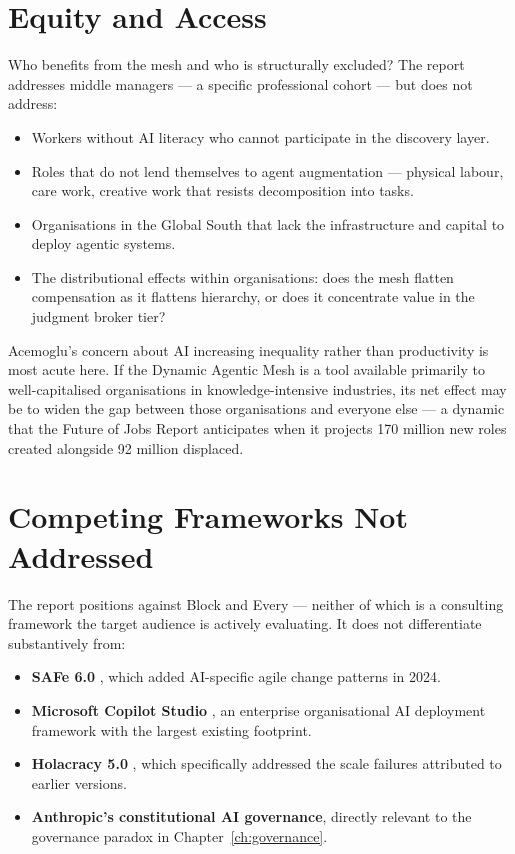 \section{Equity and Access}

Who benefits from the mesh and who is structurally excluded? The report addresses middle managers --- a specific professional cohort --- but does not address:

\begin{itemize}
  \item Workers without AI literacy who cannot participate in the discovery layer.
  \item Roles that do not lend themselves to agent augmentation --- physical labour, care work, creative work that resists decomposition into tasks.
  \item Organisations in the Global South that lack the infrastructure and capital to deploy agentic systems.
  \item The distributional effects within organisations: does the mesh flatten compensation as it flattens hierarchy, or does it concentrate value in the judgment broker tier?
\end{itemize}

Acemoglu's concern about AI increasing inequality rather than productivity is most acute here. If the Dynamic Agentic Mesh is a tool available primarily to well-capitalised organisations in knowledge-intensive industries, its net effect may be to widen the gap between those organisations and everyone else --- a dynamic that the \textcite{WEF2025} Future of Jobs Report anticipates when it projects 170 million new roles created alongside 92 million displaced.

\section{Competing Frameworks Not Addressed}

The report positions against Block and Every --- neither of which is a consulting framework the target audience is actively evaluating. It does not differentiate substantively from:

\begin{itemize}
  \item \textbf{SAFe 6.0} \parencite{SAFe2024}, which added AI-specific agile change patterns in 2024.
  \item \textbf{Microsoft Copilot Studio} \parencite{MicrosoftCopilotStudio2025}, an enterprise organisational AI deployment framework with the largest existing footprint.
  \item \textbf{Holacracy 5.0} \parencite{Holacracy2024}, which specifically addressed the scale failures attributed to earlier versions.
  \item \textbf{Anthropic's constitutional AI governance}, directly relevant to the governance paradox in Chapter~\ref{ch:governance}.
\end{itemize}

